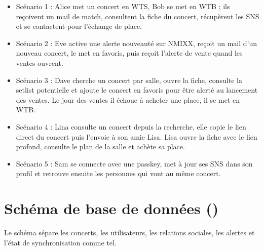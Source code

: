\documentclass[11pt,a4paper]{article}
\newcommand{\code}[1]{\texttt{\detokenize{#1}}}
\begin{document}
\begin{itemize}
  \item Scénario 1 : Alice met un concert en WTS, Bob se met en WTB ; ils reçoivent un mail de match, consultent la fiche du concert, récupèrent les SNS et se contactent pour l'échange de place.
  \item Scénario 2 : Eve active une alerte nouveauté sur NMIXX, reçoit un mail d'un nouveau concert, le met en favoris, puis reçoit l'alerte de vente quand les ventes ouvrent.
  \item Scénario 3 : Dave cherche un concert par salle, ouvre la fiche, consulte la setlist potentielle et ajoute le concert en favoris pour être alerté au lancement des ventes. Le jour des ventes il échoue à acheter une place, il se met en WTB.
  \item Scénario 4 : Lina consulte un concert depuis la recherche, elle copie le lien direct du concert puis l'envoie à son amie Lisa. Lisa ouvre la fiche avec le lien profond, consulte le plan de la salle et achète sa place.
  \item Scénario 5 : Sam se connecte avec une passkey, met à jour ses SNS dans son profil et retrouve ensuite les personnes qui vont au même concert.
\end{itemize}

\section{Schéma de base de données (\code{server/main/schema.sql})}

Le schéma sépare les concerts, les utilisateurs, les relations sociales, les alertes et l'état de synchronisation comme tel.
\end{document}
